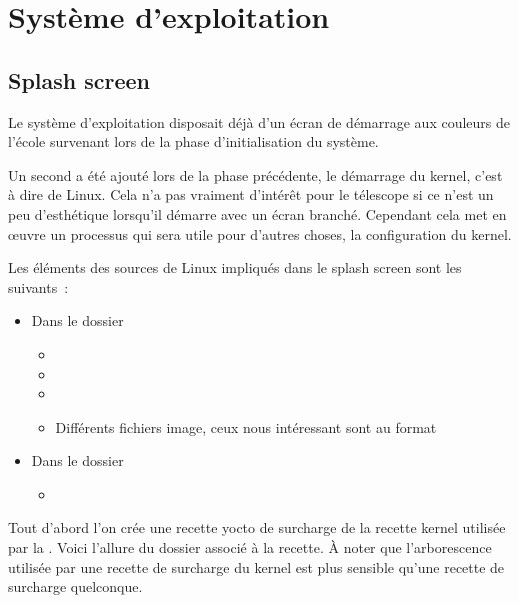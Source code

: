 \chapter{Système d'exploitation}

\section{Splash screen}

Le système d'exploitation disposait déjà d'un écran de démarrage aux couleurs de l'école survenant lors de la phase d'initialisation du système.

Un second a été ajouté lors de la phase précédente, le démarrage du kernel, c'est à dire de Linux. Cela n'a pas vraiment d'intérêt pour le télescope si ce n'est un peu d'esthétique lorsqu'il démarre avec un écran branché. Cependant cela met en œuvre un processus qui sera utile pour d'autres choses, la configuration du kernel.

\vspace{1cm}

Les éléments des sources de Linux impliqués dans le splash screen sont les suivants~:
\begin{itemize}[label=$\bullet$]
	\item Dans le dossier 
	\begin{itemize}
		\item {}
		\item {}
		\item {}
		\item Différents fichiers image, ceux nous intéressant sont au format 
		\end{itemize}
	\item Dans le dossier 
	\begin{itemize}
		\item {}
		\end{itemize}
	\end{itemize}

\vspace{1cm}

Tout d'abord l'on crée une recette yocto de surcharge de la recette kernel utilisée par la . Voici l'allure du dossier associé à la recette. À noter que l'arborescence utilisée par une recette de surcharge du kernel est plus sensible qu'une recette de surcharge quelconque.

